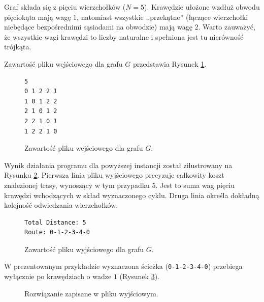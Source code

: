 \documentclass{article}
\theoremstyle{definition}
\theoremstyle{plain}
\theoremstyle{remark}
\begin{document}
Graf składa się z pięciu wierzchołków ($N=5$). Krawędzie ułożone wzdłuż obwodu pięciokąta mają wagę $1$, natomiast wszystkie ,,przekątne'' (łączące wierzchołki niebędące bezpośrednimi sąsiadami na obwodzie) mają wagę $2$. Warto zauważyć, że wszystkie wagi krawędzi to liczby naturalne i spełniona jest tu nierówność trójkąta.

Zawartość pliku wejściowego dla grafu $G$ przedstawia Rysunek \ref{lst:input}.

\begin{figure}[H]
\begin{verbatim}
5
0 1 2 2 1
1 0 1 2 2
2 1 0 1 2
2 2 1 0 1
1 2 2 1 0
\end{verbatim}
\caption{Zawartość pliku wejściowego dla grafu $G$.}
\label{lst:input}
\end{figure}

Wynik działania programu dla powyższej instancji został zilustrowany na Rysunku \ref{lst:output}. Pierwsza linia pliku wyjściowego precyzuje całkowity koszt znalezionej trasy, wynoszący w tym przypadku $5$. Jest to suma wag pięciu krawędzi wchodzących w skład wyznaczonego cyklu. Druga linia określa dokładną kolejność odwiedzania wierzchołków. 

\begin{figure}[H]
\begin{verbatim}
Total Distance: 5
Route: 0-1-2-3-4-0
\end{verbatim}
\caption{Zawartość pliku wyjściowego dla grafu $G$.}
\label{lst:output}
\end{figure}

\noindent
W prezentowanym przykładzie wyznaczona ścieżka (\texttt{0-1-2-3-4-0}) przebiega wyłącznie po krawędziach o wadze $1$ (Rysunek \ref{rys:optymalny}).

\begin{figure}[H]
    \centering
    \caption{Rozwiązanie zapisane w pliku wyjściowym.}
    \label{rys:optymalny}
\end{figure}
\end{document}
